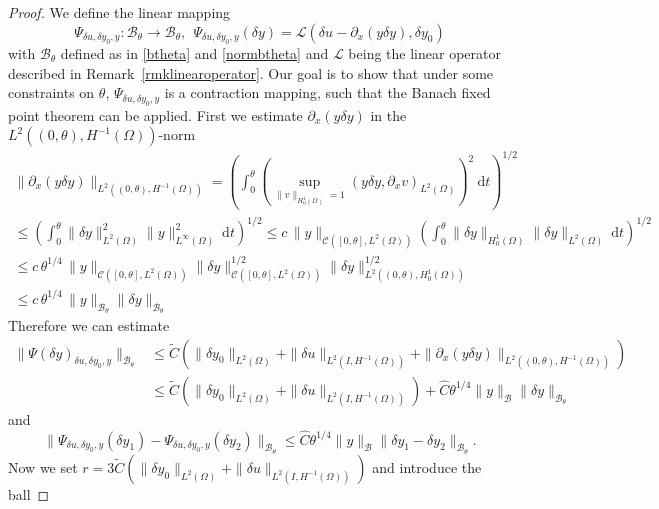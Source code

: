 \begin{proof}
We define the linear mapping
\[
\Psi_{\delta u, \delta y_0,y}\colon \mathcal B_{\theta}\rightarrow \mathcal B_{\theta},~~\Psi_{\delta u, \delta y_0,y}(\delta y) = \mathcal{L}(\delta u - \partial_x(y\delta y),\delta y_0)
\]
with $\mathcal B_{\theta}$ defined as in \eqref{btheta} and \eqref{normbtheta} and $\mathcal{L}$ being the linear \KdV operator described in Remark~\ref{rmklinearoperator}. Our goal is to show that under some constraints on $\theta$, $\Psi_{\delta u, \delta y_0,y}$ is a contraction mapping, such that the Banach fixed point theorem can be applied. First we estimate $\partial_x(y \delta y)$ in the $L^2((0,\theta),H^{-1}(\Omega))$-norm
\begin{multline}\label{estimate_variable_coefficient}
\|\partial_x(y\delta y)\|_{L^2((0,\theta),H^{-1}(\Omega))}=\left(\int_{0}^{\theta}\left(\underset{\|v\|_{H^1_0(\Omega)}=1}{\operatorname{sup}}(y\delta y,\partial_x v)_{L^2(\Omega)}\right)^2~\mathrm dt\right)^{1/2}\\
\leq\left(\int_{0}^{\theta}\|\delta y\|_{L^2(\Omega)}^2\|y\|_{L^\infty(\Omega)}^2~\mathrm dt\right)^{1/2}\leq c\,\|y\|_{\mathcal C([0,\theta],L^2(\Omega))}\left(\int_{0}^{\theta}\|\delta y\|_{H^1_0(\Omega)}\|\delta y\|_{L^2(\Omega)}~\mathrm dt\right)^{1/2}\\
\leq c\,\theta^{1/4}\,\|y\|_{\mathcal C([0,\theta],L^2(\Omega))}\|\delta y\|_{\mathcal C([0,\theta],L^2(\Omega))}^{1/2}\|\delta y\|_{L^2((0,\theta),H^1_0(\Omega))}^{1/2}\\
\leq c\,\theta^{1/4}\,\|y\|_{\mathcal B_{\theta}}\|\delta y\|_{\mathcal B_{\theta}}
\end{multline}
Therefore we can estimate
\begin{align*}
\|\Psi(\delta y)_{\delta u, \delta y_0,y}\|_{\mathcal B_{\theta}} & \leq \widetilde{C}\left(\|\delta y_0\|_{L^2(\Omega)}+\|\delta u\|_{L^2(I,H^{-1}(\Omega))}+\|\partial_x(y\delta y)\|_{L^2((0,\theta),H^{-1}(\Omega))}\right)\\
&\leq \widetilde{C}\left(\|\delta y_0\|_{L^2(\Omega)}+\|\delta u\|_{L^2(I,H^{-1}(\Omega))}\right) + \hat C\theta^{1/4}\|y\|_{\mathcal B}\|\delta y\|_{\mathcal B_{\theta}}
\end{align*}
and
\[
\|\Psi_{\delta u, \delta y_0,y}(\delta y_1)-\Psi_{\delta u, \delta y_0,y}(\delta y_2)\|_{\mathcal B_{\theta}}\leq \hat C\theta^{1/4}\|y\|_{\mathcal B}\|\delta y_1-\delta y_2\|_{\mathcal B_{\theta}}.
\]
Now we set $r=3 \widetilde{C}\left(\|\delta y_0\|_{L^2(\Omega)}+\|\delta u\|_{L^2(I,H^{-1}(\Omega))}\right)$ and introduce the ball

\end{proof}

